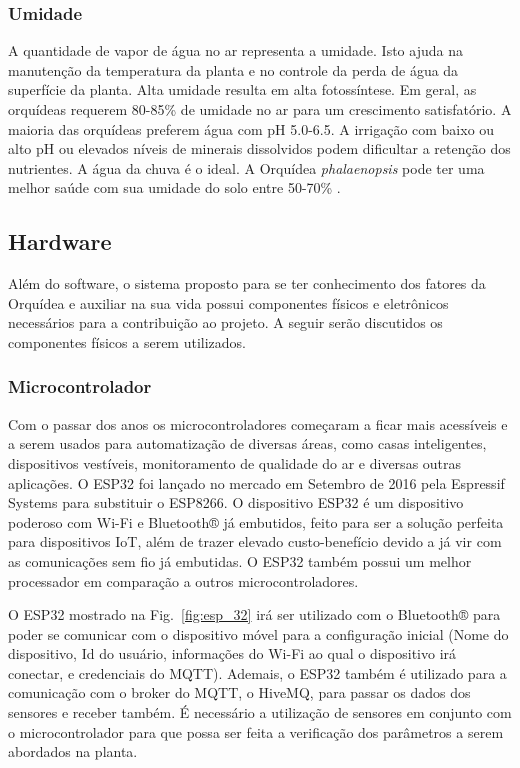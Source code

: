 \documentclass[conference]{IEEEtran}
\begin{document}
\subsubsection{Umidade}
A quantidade de vapor de água no ar representa a umidade. Isto ajuda na manutenção da temperatura da planta e no controle da perda de água da superfície da planta. Alta umidade resulta em alta fotossíntese. Em geral, as orquídeas requerem 80-85\% de umidade no ar para um crescimento satisfatório. A maioria das orquídeas preferem água com pH 5.0-6.5. A irrigação com baixo ou alto pH ou elevados níveis de minerais dissolvidos podem dificultar a retenção dos nutrientes. A água da chuva é o ideal. A Orquídea {\itshape{phalaenopsis}} pode ter uma melhor saúde com sua umidade do solo entre 50-70\% . \cite{b1, b4, b5, b6, b7}

\subsection{Hardware}
Além do software, o sistema proposto para se ter conhecimento dos fatores da Orquídea e auxiliar na sua vida possui componentes físicos e eletrônicos necessários para a contribuição ao projeto. A seguir serão discutidos os componentes físicos a serem utilizados.

\subsubsection{Microcontrolador}
Com o passar dos anos os microcontroladores começaram a ficar mais acessíveis e a serem usados para automatização de diversas áreas, como casas inteligentes, dispositivos vestíveis, monitoramento de qualidade do ar e diversas outras aplicações.
O ESP32 foi lançado no mercado em Setembro de 2016 pela Espressif Systems para substituir o ESP8266. O dispositivo ESP32 é um dispositivo poderoso com Wi-Fi e Bluetooth® já embutidos, feito para ser a solução perfeita para dispositivos IoT,\cite{b8} além de trazer elevado custo-benefício devido a já vir com as comunicações sem fio já embutidas. O ESP32 também possui um melhor processador em comparação a outros microcontroladores.\cite{b8}

O ESP32 mostrado na Fig.~\ref{fig:esp_32} irá ser utilizado com o Bluetooth® para poder se comunicar com o dispositivo móvel para a configuração inicial (Nome do dispositivo, Id do usuário, informações do Wi-Fi ao qual o dispositivo irá conectar, e credenciais do MQTT). Ademais, o ESP32 também é utilizado para a comunicação com o broker do MQTT, o HiveMQ, para passar os dados dos sensores e receber também. É necessário a utilização de sensores em conjunto com o microcontrolador para que possa ser feita a verificação dos parâmetros a serem abordados na planta.
\end{document}
